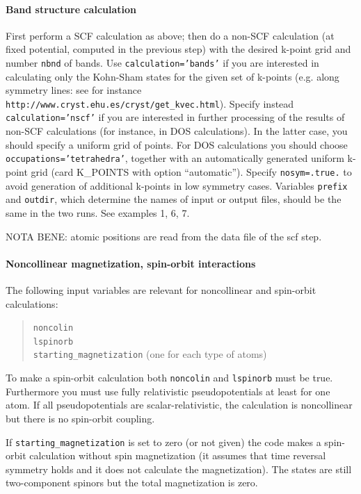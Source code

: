 \documentclass[12pt,a4paper]{article}
\begin{document}
\paragraph{Band structure calculation}
First perform a SCF calculation as above;
then do a non-SCF calculation (at fixed potential, computed in the
previous step) with the desired k-point grid and  number \texttt{nbnd}
of bands. 
Use \texttt{calculation='bands'} if you are interested in calculating
only the Kohn-Sham states for the given set of k-points
(e.g. along symmetry lines: see for instance
\texttt{http://www.cryst.ehu.es/cryst/get\_kvec.html}). Specify instead
\texttt{calculation='nscf'} if you are interested in further processing 
of the results of non-SCF calculations (for instance, in DOS calculations).
In the latter case, you should specify a uniform grid of points.
For DOS calculations you should choose \texttt{occupations='tetrahedra'}, 
together with an automatically generated uniform k-point grid 
(card K\_POINTS with option ``automatic'').
Specify \texttt{nosym=.true.} to avoid generation of additional k-points in
low symmetry cases. Variables \texttt{prefix} and \texttt{outdir}, which
determine
the names of input or output files, should be the same in the two runs.
See examples 1, 6, 7.

NOTA BENE: atomic positions are read from the data file of the scf step.

\paragraph{Noncollinear magnetization, spin-orbit interactions}

The following input variables are relevant for noncollinear and
spin-orbit calculations: 
\begin{quote}
      \texttt{noncolin}\\
      \texttt{lspinorb}\\
      \texttt{starting\_magnetization} (one for each type of atoms)
\end{quote}
To make a spin-orbit calculation both \texttt{noncolin} and
\texttt{lspinorb} must be true. Furthermore you must use fully
relativistic pseudopotentials at least for one atom. If all
pseudopotentials are scalar-relativistic, the calculation is
noncollinear but there is no spin-orbit coupling.

If \texttt{starting\_magnetization} is set to zero (or not given) 
the code makes a spin-orbit calculation without spin magnetization 
(it assumes that time reversal symmetry holds and it does not calculate 
the magnetization). The states are still two-component spinors but the
total magnetization is zero. 
\end{document}
